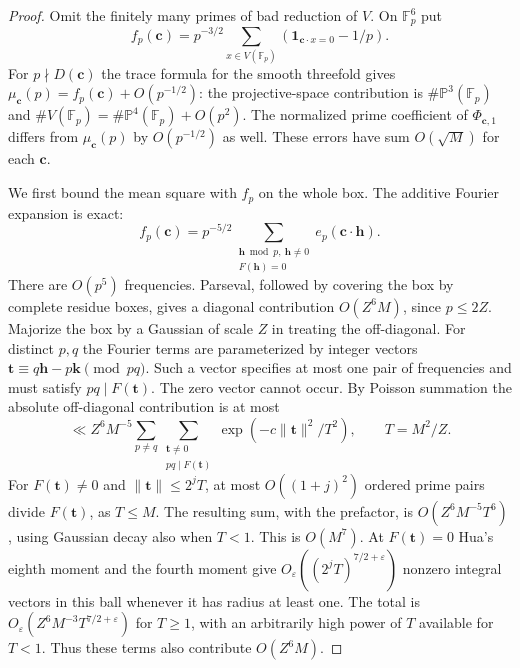 \documentclass[11pt,letterpaper]{article}
\theoremstyle{definition}
\begin{document}
\begin{proof}
Omit the finitely many primes of bad reduction of $V$. On
$\mathbb F_p^6$ put
\[
 f_p(\mathbf c)=p^{-3/2}\sum_{x\in V(\mathbb F_p)}
             (\mathbf1_{\mathbf c\cdot x=0}-1/p).
\]
For $p\nmid D(\mathbf c)$ the trace formula for the smooth threefold
gives $\mu_{\mathbf c}(p)=f_p(\mathbf c)+O(p^{-1/2})$:
the projective-space contribution is
$\#\mathbb P^3(\mathbb F_p)$ and
$\# V(\mathbb F_p)=\#\mathbb P^4(\mathbb F_p)+O(p^2)$.
The normalized prime coefficient of $\Phi_{\mathbf c,1}$ differs
from $\mu_{\mathbf c}(p)$ by $O(p^{-1/2})$ as well. These errors
have sum $O(\sqrt M)$ for each $\mathbf c$.

We first bound the mean square with $f_p$ on the whole box. The
additive Fourier expansion is exact:
\[
 f_p(\mathbf c)=p^{-5/2}
   \sum_{\substack{\mathbf h\bmod p,\ \mathbf h\ne0\\ F(\mathbf h)=0}}
              e_p(\mathbf c\cdot\mathbf h).
\]
There are $O(p^5)$ frequencies. Parseval, followed by covering the
box by complete residue boxes, gives a diagonal contribution
$O(Z^6 M)$, since $p\le2Z$. Majorize the box by a Gaussian of scale
$Z$ in treating the off-diagonal. For distinct $p,q$ the Fourier
terms are parameterized by integer vectors
$\mathbf t\equiv q\mathbf h-p\mathbf k\pmod{pq}$. Such a vector
specifies at most one pair of frequencies and must satisfy
$pq\mid F(\mathbf t)$. The zero vector cannot occur. By Poisson
summation the absolute off-diagonal contribution is at most
\[
 \ll Z^6M^{-5}
 \sum_{p\ne q}\sum_{\substack{\mathbf t\ne0\\pq\mid F(\mathbf t)}}
             \exp(-c\|\mathbf t\|^2/T^2),\qquad T=M^2/Z .
\]
For $F(\mathbf t)\ne0$ and $\|\mathbf t\|\le 2^j T$, at most
$O((1+j)^2)$ ordered prime pairs divide $F(\mathbf t)$, as $T\le M$.
The resulting sum, with the prefactor, is $O(Z^6M^{-5}T^6)$, using
Gaussian decay also when $T<1$. This is $O(M^7)$. At $F(\mathbf t)=0$
Hua's eighth moment and the fourth moment give
$O_\varepsilon((2^jT)^{7/2+\varepsilon})$ nonzero integral vectors
in this ball whenever it has radius at least one. The total is
$O_\varepsilon(Z^6M^{-3}T^{7/2+\varepsilon})$ for $T\ge1$, with
an arbitrarily high power of $T$ available for $T<1$. Thus these
terms also contribute $O(Z^6M)$.


\end{proof}
\end{document}
